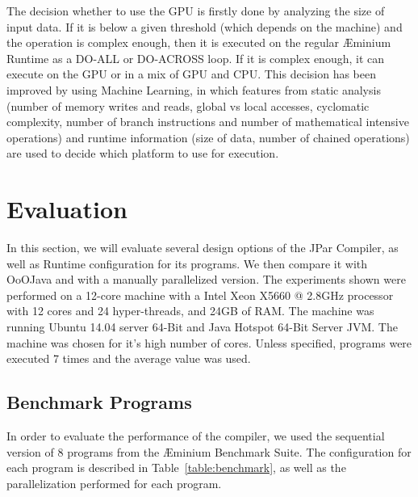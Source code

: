 \documentclass[smallextended]{svjour3}
\begin{document}
The decision whether to use the GPU is firstly done by analyzing the size of input data. If it is below a given threshold (which depends on the machine) and the operation is complex enough, then it is executed on the regular Æminium Runtime as a DO-ALL or DO-ACROSS loop. If it is complex enough, it can execute on the GPU or in a mix of GPU and CPU. This decision has been improved by using Machine Learning\cite{fonseca2013aeminiumgpu}, in which features from static analysis (number of memory writes and reads, global vs local accesses, cyclomatic complexity, number of branch instructions and number of mathematical intensive operations) and runtime information (size of data, number of chained operations) are used to decide which platform to use for execution.


\section{Evaluation}
\label{sec:evaluation}

In this section, we will evaluate several design options of the JPar Compiler, as well as Runtime configuration for its programs. We then compare it with OoOJava and with a manually parallelized version. The experiments shown were performed on a 12-core machine with a Intel Xeon X5660 @ 2.8GHz processor with 12 cores and 24 hyper-threads, and 24GB of RAM. The machine was running Ubuntu 14.04 server 64-Bit and Java Hotspot 64-Bit Server JVM. The machine was chosen for it's high number of cores. Unless specified, programs were executed 7 times and the average value was used.


\subsection{Benchmark Programs}

In order to evaluate the performance of the compiler, we used the sequential version of 8 programs from the Æminium Benchmark Suite\cite{aebenchmarks}. The configuration for each program is described in Table~\ref{table:benchmark}, as well as the parallelization performed for each program.

\end{document}

